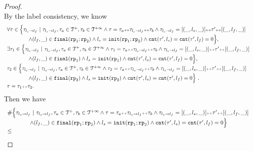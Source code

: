 \begin{proof}
\\
By the label consistency, we know 
\[
  \begin{array}{l}
    \forall \mathtt{\tau} \in
    \Big\{\mathtt{\tau}_{l_s \to l_f} ~\vert~ \mathtt{\tau}_{l_s \to l_f}, \mathtt{\tau}_a \in \mathcal{T}^{+}, \mathtt{\tau}_b \in \mathcal{T}^{+\infty}
    \land \mathtt{\tau} = \mathtt{\tau}_a {\scriptscriptstyle ++} \mathtt{\tau}_{l_s \to l_f} {\scriptscriptstyle ++} \mathtt{\tau}_b
    \land \mathtt{\tau}_{l_s \to l_f} = [(\_, l_s, \_)] {\scriptscriptstyle ++} \mathtt{\tau}' {\scriptscriptstyle ++} [(\_, l_f, \_)]
    \\ \qquad \qquad
    \land (l_{f}, \_) \in \mathtt{final}(\mathtt{rp}_1; \mathtt{rp}_2)
    \land l_s = \mathtt{init}(\mathtt{rp}_1; \mathtt{rp}_2)
    \land \mathtt{cnt}(\mathtt{\tau}', l_s) = \mathtt{cnt}(\mathtt{\tau}', l_f) = 0 
    \Big\},
    \\
    \exists \mathtt{\tau}_1 \in
    \Big\{\mathtt{\tau}_{l_s \to l_f} ~\vert~ \mathtt{\tau}_{l_s \to l_f}, \mathtt{\tau}_a \in \mathcal{T}^{+}, \mathtt{\tau}_b \in \mathcal{T}^{+\infty}
    \land \mathtt{\tau}_1 = \mathtt{\tau}_a {\scriptscriptstyle ++} \mathtt{\tau}_{l_s \to l_f} {\scriptscriptstyle ++} \mathtt{\tau}_b
    \land \mathtt{\tau}_{l_s \to l_f} = [(\_, l_s, \_)] {\scriptscriptstyle ++} \mathtt{\tau}' {\scriptscriptstyle ++} [(\_, l_f, \_)]
    \\ \qquad \qquad
    \land (l_{f}, \_) \in \mathtt{final}(\mathtt{rp}_1)
    \land l_s = \mathtt{init}(\mathtt{rp}_1)
    \land \mathtt{cnt}(\mathtt{\tau}', l_s) = \mathtt{cnt}(\mathtt{\tau}', l_f) = 0 
    \Big\},
    \\
    \mathtt{\tau}_2 \in
    \Big\{\mathtt{\tau}_{l_s \to l_f} ~\vert~ \mathtt{\tau}_{l_s \to l_f}, \mathtt{\tau}_a \in \mathcal{T}^{+}, \mathtt{\tau}_b \in \mathcal{T}^{+\infty}
    \land \mathtt{\tau}_2 = \mathtt{\tau}_a {\scriptscriptstyle ++} \mathtt{\tau}_{l_s \to l_f} {\scriptscriptstyle ++} \mathtt{\tau}_b
    \land \mathtt{\tau}_{l_s \to l_f} = [(\_, l_s, \_)] {\scriptscriptstyle ++} \mathtt{\tau}' {\scriptscriptstyle ++} [(\_, l_f, \_)]
   \\ \qquad \qquad
   \land (l_{f}, \_) \in \mathtt{final}(\mathtt{rp}_2)
   \land l_s = \mathtt{init}(\mathtt{rp}_2)
   \land \mathtt{cnt}(\mathtt{\tau}', l_s) = \mathtt{cnt}(\mathtt{\tau}', l_f) = 0 
   \Big\} 
   ~.~ 
   \\
   \mathtt{\tau} = \mathtt{\tau}_1 {\scriptscriptstyle ++} \mathtt{\tau}_2.
    \end{array}
  \]
  Then we have
  \[
    \begin{array}{l}
      \# \Big\{\mathtt{\tau}_{l_s \to l_f} ~\vert~ \mathtt{\tau}_{l_s \to l_f}, \mathtt{\tau}_a \in \mathcal{T}^{+}, \mathtt{\tau}_b \in \mathcal{T}^{+\infty}
      \land \mathtt{\tau} = \mathtt{\tau}_a {\scriptscriptstyle ++} \mathtt{\tau}_{l_s \to l_f} {\scriptscriptstyle ++} \mathtt{\tau}_b
      \land \mathtt{\tau}_{l_s \to l_f} = [(\_, l_s, \_)] {\scriptscriptstyle ++} \mathtt{\tau}' {\scriptscriptstyle ++} [(\_, l_f, \_)]
      \\ \qquad \qquad
      \land (l_{f}, \_) \in \mathtt{final}(\mathtt{rp}_1; \mathtt{rp}_2)
      \land l_s = \mathtt{init}(\mathtt{rp}_1; \mathtt{rp}_2)
      \land \mathtt{cnt}(\mathtt{\tau}', l_s) = \mathtt{cnt}(\mathtt{\tau}', l_f) = 0 
      \Big\}
      \\ \leq 

\end{array}\]
\end{proof}
